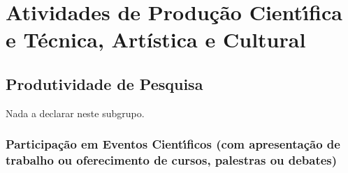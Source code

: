\documentclass[a4paper,oneside,10pt]{article}
\begin{document}
\newpage
\section{Atividades de Produ\c{c}\~{a}o Cient\'{\i}fica e T\'{e}cnica, Art\'{i}stica e Cultural}

\subsection{Produtividade de Pesquisa}
\vspace{0.3cm}

Nada a declarar neste subgrupo.
%
%
%
%


\subsubsection{Participa\c{c}\~{a}o em Eventos Cient\'{\i}ficos (com apresenta\c{c}\~{a}o de trabalho ou oferecimento de cursos, palestras ou debates)}
\vspace{0.3cm}
\end{document}
